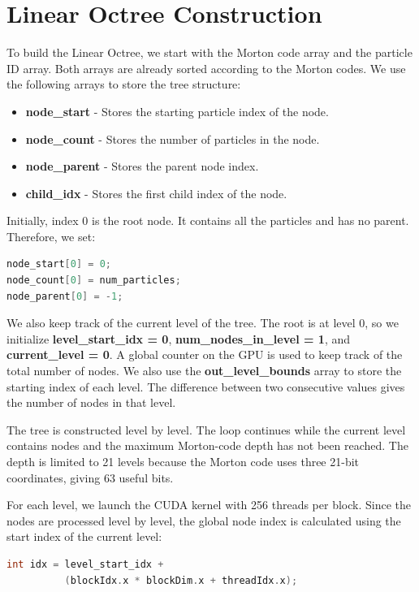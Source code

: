 \section{Linear Octree Construction}

To build the Linear Octree, we start with the Morton code array and the particle ID array. Both arrays are already sorted according to the Morton codes. We use the following arrays to store the tree structure:

\begin{itemize}
    \item \textbf{node\_start} - Stores the starting particle index of the node.
    \item \textbf{node\_count} - Stores the number of particles in the node.
    \item \textbf{node\_parent} - Stores the parent node index.
    \item \textbf{child\_idx} - Stores the first child index of the node.
\end{itemize}

Initially, index 0 is the root node. It contains all the particles and has no parent. Therefore, we set:

\begin{lstlisting}[language=C]
node_start[0] = 0;
node_count[0] = num_particles;
node_parent[0] = -1;
\end{lstlisting}

We also keep track of the current level of the tree. The root is at level 0, so we initialize \textbf{level\_start\_idx = 0}, \textbf{num\_nodes\_in\_level = 1}, and \textbf{current\_level = 0}. A global counter on the GPU is used to keep track of the total number of nodes. We also use the \textbf{out\_level\_bounds} array to store the starting index of each level. The difference between two consecutive values gives the number of nodes in that level.

The tree is constructed level by level. The loop continues while the current level contains nodes and the maximum Morton-code depth has not been reached. The depth is limited to 21 levels because the Morton code uses three 21-bit coordinates, giving 63 useful bits.

For each level, we launch the CUDA kernel with 256 threads per block. Since the nodes are processed level by level, the global node index is calculated using the start index of the current level:

\begin{lstlisting}[language=C]
int idx = level_start_idx +
          (blockIdx.x * blockDim.x + threadIdx.x);
\end{lstlisting}


